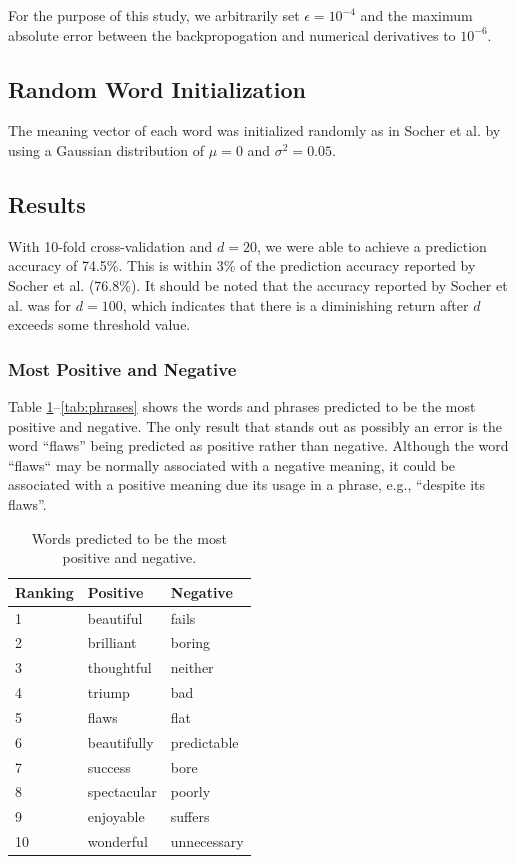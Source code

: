 \documentclass{article}
\newcommand{\ra}[1]{\renewcommand{\arraystretch}{#1}}
\begin{document}
For the purpose of this study, we arbitrarily set $\epsilon = 10^{-4}$ and the maximum absolute error between the backpropogation and numerical derivatives to $10^{-6}$. 


%
%
\subsection{Random Word Initialization}
The meaning vector of each word was initialized randomly as in Socher et al. by using a Gaussian distribution of $\mu = 0$ and $\sigma ^2 = 0.05$.


%
%
\subsection{Results}
With 10-fold cross-validation and $d=20$, we were able to achieve a prediction accuracy of 74.5\%. This is within 3\% of the prediction accuracy reported by Socher et al. (76.8\%). It should be noted that the accuracy reported by Socher et al. was for $d=100$, which indicates that there is a diminishing return after $d$ exceeds some threshold value.


\subsubsection{Most Positive and Negative}
Table \ref{tab:words}--\ref{tab:phrases} shows the words and phrases predicted to be the most positive and negative. The only result that stands out as possibly an error is the word ``flaws'' being predicted as positive rather than negative. Although the word ``flaws`` may be normally associated with a negative meaning, it could be associated with a positive meaning due its usage in a phrase, e.g., ``despite its flaws''.


\begin{table}[t]
    \centering

    \caption{Words predicted to be the most positive and negative.} 
    \label{tab:words}

    \ra{1.2}
    \begin{tabular}{@{} l l l @{}}
        \\
        \toprule
        \bf{Ranking} & \bf{Positive} & \bf{Negative} \\
        \midrule
        1 & beautiful   & fails  \\
        2 & brilliant   & boring \\
        3 & thoughtful  & neither\\
        4 & triump      & bad \\
        5 & flaws       & flat \\
        6 & beautifully & predictable \\
        7 & success     & bore \\
        8 & spectacular & poorly \\
        9 & enjoyable   & suffers \\
        10 & wonderful  & unnecessary \\
        \bottomrule
    \end{tabular}
\end{table}
\end{document}
